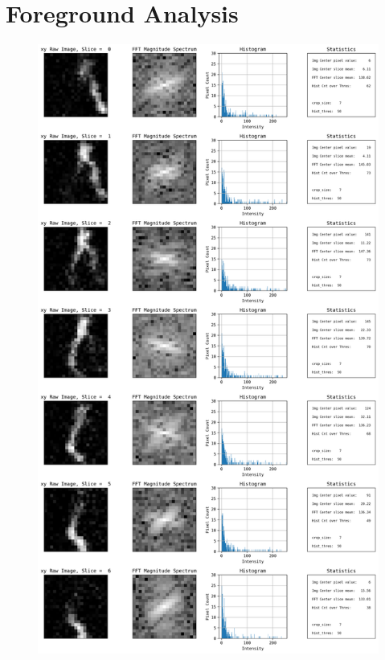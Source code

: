 \documentclass{neu_handout}
\begin{document}
\section{Foreground Analysis}
\begin{figure}[!h]
  \includegraphics[width=0.65\linewidth]{foreground-xy-1}
  \label{fig:foreground-xy-1}
\end{figure}

\newpage
\end{document}
